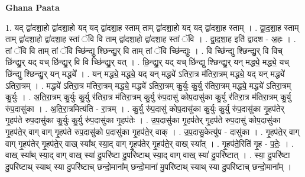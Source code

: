 \documentclass[17pt]{extarticle}
\begin{document}
\textbf{Ghana Paata } \newline

1. यद् द्वा॑दशा॒हो द्वा॑दशा॒हो यद् यद् द्वा॑दशा॒ह स्ताम् ताम् द्वा॑दशा॒हो यद् यद् द्वा॑दशा॒ह स्ताम् । . द्वा॒द॒शा॒ह स्ताम् ताम् द्वा॑दशा॒हो द्वा॑दशा॒ह स्तां ॅवि वि ताम् द्वा॑दशा॒हो द्वा॑दशा॒ह स्तां ॅवि । . द्वा॒द॒शा॒ह इति॑ द्वादश - अ॒हः । . तां ॅवि वि ताम् तां ॅवि च्छि॑न्द्यु श्छिन्द्यु॒र् वि ताम् तां ॅवि च्छि॑न्द्युः । . वि च्छि॑न्द्यु श्छिन्द्यु॒र् वि विच् छि॑न्द्यु॒र् यद् यच् छि॑न्द्यु॒र् वि वि च्छि॑न्द्यु॒र् यत् । . छि॒न्द्यु॒र् यद् यच् छि॑न्द्यु श्छिन्द्यु॒र् यन् मद्ध्ये॒ मद्ध्ये॒ यच् छि॑न्द्यु श्छिन्द्यु॒र् यन् मद्ध्ये᳚ । . यन् मद्ध्ये॒ मद्ध्ये॒ यद् यन् मद्ध्ये॑ ऽतिरा॒त्र म॑तिरा॒त्रम् मद्ध्ये॒ यद् यन् मद्ध्ये॑ ऽतिरा॒त्रम् । . मद्ध्ये॑ ऽतिरा॒त्र म॑तिरा॒त्रम् मद्ध्ये॒ मद्ध्ये॑ ऽतिरा॒त्रम् कु॒र्युः कु॒र्यु र॑तिरा॒त्रम् मद्ध्ये॒ मद्ध्ये॑ ऽतिरा॒त्रम् कु॒र्युः । . अ॒ति॒रा॒त्रम् कु॒र्युः कु॒र्यु र॑तिरा॒त्र म॑तिरा॒त्रम् कु॒र्यु रु॑प॒दासु॑ कोप॒दासु॑का कु॒र्यु र॑तिरा॒त्र म॑तिरा॒त्रम् कु॒र्यु रु॑प॒दासु॑का । . अ॒ति॒रा॒त्रमित्य॑ति - रा॒त्रम् । . कु॒र्यु रु॑प॒दासु॑ कोप॒दासु॑का कु॒र्युः कु॒र्यु रु॑प॒दासु॑का गृ॒हप॑तेर् गृ॒हप॑ते रुप॒दासु॑का कु॒र्युः कु॒र्यु रु॑प॒दासु॑का गृ॒हप॑तेः । . उ॒प॒दासु॑का गृ॒हप॑तेर् गृ॒हप॑ते रुप॒दासु॑ कोप॒दासु॑का गृ॒हप॑ते॒र् वाग् वाग् गृ॒हप॑ते रुप॒दासु॑को प॒दासु॑का गृ॒हप॑ते॒र् वाक् । . उ॒प॒दासु॒केत्यु॑प - दासु॑का । . गृ॒हप॑ते॒र् वाग् वाग् गृ॒हप॑तेर् गृ॒हप॑ते॒र् वाख् स्या᳚थ् स्या॒द् वाग् गृ॒हप॑तेर् गृ॒हप॑ते॒र् वाख् स्या᳚त् । . गृ॒हप॑ते॒रिति॑ गृ॒ह - प॒तेः॒ । . वाख् स्या᳚थ् स्या॒द् वाग् वाख् स्या॑ दु॒परि॑ष्टा दु॒परि॑ष्टाथ् स्या॒द् वाग् वाख् स्या॑ दु॒परि॑ष्टात् । . स्या॒ दु॒परि॑ष्टा दु॒परि॑ष्टाथ् स्याथ् स्या दु॒परि॑ष्टाच् छन्दो॒माना᳚म् छन्दो॒माना॑ मु॒परि॑ष्टाथ् स्याथ् स्या दु॒परि॑ष्टाच् छन्दो॒माना᳚म् । \newline
\end{document}
